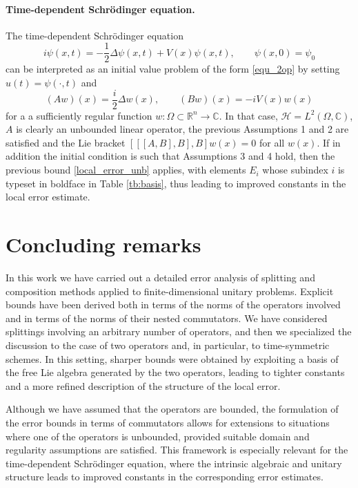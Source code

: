 \documentclass[11pt]{article}
\begin{document}
\paragraph{Time-dependent Schr\"odinger equation.}

The time-dependent Schr\"odinger equation
\[
  i \psi(x,t) = -\frac{1}{2} \Delta \psi(x,t) + V(x) \psi(x,t), \qquad \psi(x,0) = \psi_0
\]
can be interpreted as an initial value problem of the form \eqref{equ_2op} by setting $u(t) = \psi(\cdot,t)$ and
\[
  (A w)(x) = \frac{i}{2} \Delta w(x), \qquad (Bw)(x) = -i V(x) w(x)
\]
for a a sufficiently regular function $w: \Omega \subset \mathbb{R}^n \longrightarrow \mathbb{C}$. In that case,
$\mathcal{H} = L^2(\Omega, \mathbb{C})$, $A$ is clearly an unbounded linear operator, the previous Assumptions 1 and 2
are satisfied and the Lie bracket
$[[[A,B],B],B] w(x) =0$ for all $w(x)$. If in addition the initial condition is such that Assumptions 3 and 4 hold, then the previous
bound \eqref{local_error_unb} applies, with elements $E_i$ whose subindex $i$ is typeset in boldface in Table \ref{tb:basis}, thus
leading to improved constants in the local error estimate.

\section{Concluding remarks}

In this work we have carried out a detailed error analysis of splitting and
composition methods applied to finite-dimensional unitary problems.
Explicit bounds have been derived both in terms of the norms of the
operators involved and in terms of the norms of their nested commutators.
We have considered splittings involving an arbitrary number of operators, and then 
we specialized the discussion to the case
of two operators and, in particular, to time-symmetric schemes. In this
setting, sharper bounds were obtained by exploiting a basis of the free
Lie algebra generated by the two operators, leading to tighter constants
and a more refined description of the structure of the local error.

Although we have assumed that
the operators are bounded, the formulation of the error bounds in terms
of commutators allows for extensions to situations where one of the
operators is unbounded, provided suitable domain and regularity
assumptions are satisfied. This framework is especially relevant for the
time-dependent Schr\"odinger equation, where the intrinsic algebraic and
unitary structure leads to improved constants in the corresponding error
estimates.
\end{document}
